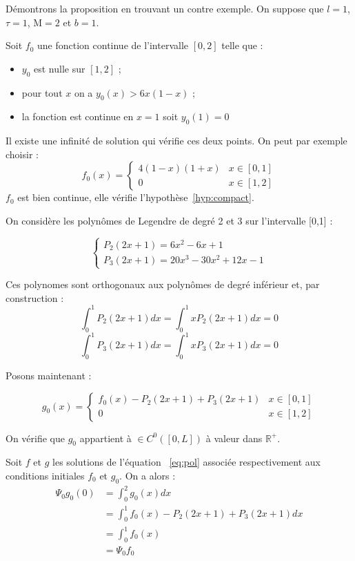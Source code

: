 \documentclass[a4paper]{article}
\newcommand{\mass}{\mathrm{M}}
\newcommand{\dep}{b}
\begin{document}
\begin{preuve}
	Démontrons la proposition en trouvant un contre exemple.
	On suppose que $l=1$, $\tau =1$, $\mass=2$ et $\dep=1$. 
	
	Soit $f_0$ une fonction continue de l'intervalle $[0,2]$ telle que :
	\begin{itemize}
		\item $y_0$ est nulle sur $[1,2]$ ;
		 \item pour tout $x$ on a $y_0(x)> 6x(1-x)$ ;
		 \item la fonction est continue en $x=1$ soit $y_0(1)=0$
   \end{itemize}

Il existe une infinité de solution qui vérifie ces deux points. On peut par exemple choisir :
	\[
	f_0 (x) = \begin{cases}
		       4(1-x)(1+x) & x \in [0,1]\\
		       0  & x \in [1,2]
	          \end{cases}
	\]
	$f_0$ est bien continue, elle vérifie l'hypothèse~\eqref{hyp:compact}. 
	
	On considère les polynômes de Legendre de degré 2 et 3 sur l'intervalle [0,1] :
	
	\[
	\begin{cases}
		P_2(2x+1) = 6x^2-6x+1 \\
		P_3(2x+1) = 20x^3 - 30x^2 +12x -1
	\end{cases}
	\]
	
	Ces polynomes sont orthogonaux aux polynômes de degré inférieur et, par construction : 
	\[ \int_0^1 P_2(2x+1)dx = \int_0^1 x P_2(2x+1)dx  =0 \]
	\[ \int_0^1 P_3(2x+1)dx = \int_0^1 x P_3(2x+1)dx =0 \]
	
	Posons maintenant :
	
	\[
	g_0 (x) = \begin{cases}
		       f_0 (x) - P_2(2x+1) + P_3(2x+1) & x \in [0,1]\\
		       0  & x \in [1,2]
	          \end{cases}
	\]
	
	On vérifie que $g_0$ appartient à $\in C^0([0,L])$ à valeur dans $\mathbb{R}^+$.
	
	Soit $f$ et $g$ les solutions de l'équation ~\eqref{eq:pol} associée respectivement aux conditions initiales $f_0$ et $g_0$. On a alors :
	\[
	\begin{split}
		\Psi_0 g_0 (0) & = \int_0^2 g_0(x)dx \\
		               & = \int_0^1 f_0 (x) - P_2(2x+1) + P_3(2x+1) dx \\
					   & =  \int_0^1 f_0 (x) \\
					   & = \Psi_0 f_0 
	\end{split}
	\]
	

\end{preuve}
\end{document}

